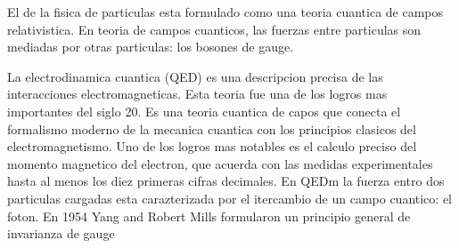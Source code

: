 El {\SM} de la fisica de particulas esta formulado como una
teoria cuantica de campos relativistica.
En teoria de campos cuanticos, las fuerzas entre particulas
son mediadas por otras particulas: los bosones de gauge.

La electrodinamica cuantica (QED) es una descripcion precisa
de las interacciones electromagneticas. Esta teoria fue una de
los logros mas importantes del siglo 20. Es una teoria cuantica
de capos que conecta el formalismo moderno de la mecanica cuantica
con los principios clasicos del electromagnetismo. Uno de los
logros mas notables es el calculo preciso del momento magnetico
del electron, que acuerda con las medidas experimentales hasta
al menos los diez primeras cifras decimales. En QEDm la fuerza
entro dos particulas cargadas esta carazterizada por el itercambio
de un campo cuantico: el foton. En 1954 Yang and Robert Mills
formularon un principio general de invarianza de gauge

